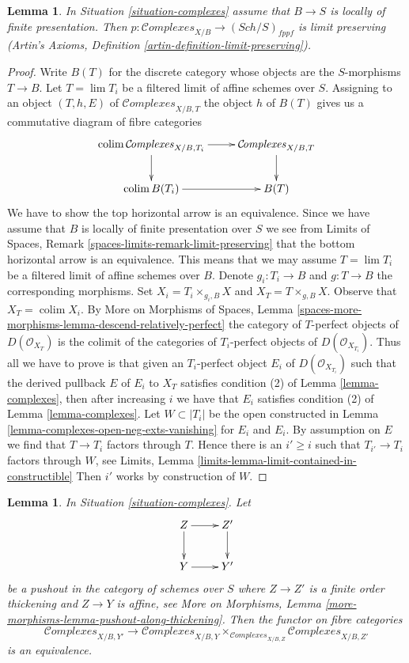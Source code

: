 \documentclass{stacks-project}
\theoremstyle{plain}
\newtheorem{lemma}[subsection]{Lemma}
\theoremstyle{definition}
\theoremstyle{remark}
\numberwithin{equation}{subsection}
\def\lim{\mathop{\mathrm{lim}}\nolimits}
\def\colim{\mathop{\mathrm{colim}}\nolimits}
\def\Sch{\mathit{Sch}}
\def\Complexesstack{\mathcal{C}\!\mathit{omplexes}}
\begin{document}
\begin{lemma}
\label{lemma-complexes-limits}
In Situation \ref{situation-complexes} assume that $B \to S$
is locally of finite presentation. Then
$p : \Complexesstack_{X/B} \to (\Sch/S)_{fppf}$ is limit preserving
(Artin's Axioms, Definition \ref{artin-definition-limit-preserving}).
\end{lemma}

\begin{proof}
Write $B(T)$ for the discrete category whose
objects are the $S$-morphisms $T \to B$. Let $T = \lim T_i$ be a filtered
limit of affine schemes over $S$. Assigning to an object
$(T, h, E)$ of $\Complexesstack_{X/B, T}$ the object $h$
of $B(T)$ gives us a commutative diagram of fibre categories
$$
\xymatrix{
\colim \Complexesstack_{X/B, T_i} \ar[r] \ar[d] &
\Complexesstack_{X/B, T} \ar[d] \\
\colim B(T_i) \ar[r] & B(T)
}
$$
We have to show the top horizontal arrow is an equivalence. Since
we have assume that $B$ is locally of finite presentation over $S$
we see from
Limits of Spaces, Remark \ref{spaces-limits-remark-limit-preserving}
that the bottom horizontal arrow is an equivalence. This means that
we may assume $T = \lim T_i$ be a filtered limit of affine schemes over
$B$. Denote $g_i : T_i \to B$ and $g : T \to B$ the corresponding
morphisms. Set $X_i = T_i \times_{g_i, B} X$ and $X_T = T \times_{g, B} X$.
Observe that $X_T = \colim X_i$.
By More on Morphisms of Spaces, Lemma
\ref{spaces-more-morphisms-lemma-descend-relatively-perfect}
the category of $T$-perfect objects of $D(\mathcal{O}_{X_T})$
is the colimit of the categories of $T_i$-perfect objects
of $D(\mathcal{O}_{X_{T_i}})$.
Thus all we have to prove is that given an $T_i$-perfect object
$E_i$ of $D(\mathcal{O}_{X_{T_i}})$ such that
the derived pullback $E$ of $E_i$ to $X_T$ satisfies
condition (2) of Lemma \ref{lemma-complexes},
then after increasing $i$ we have that
$E_i$ satisfies
condition (2) of Lemma \ref{lemma-complexes}.
Let $W \subset |T_i|$ be the open constructed
in Lemma \ref{lemma-complexes-open-neg-exts-vanishing}
for $E_i$ and $E_i$. By assumption on $E$ we find
that $T \to T_i$ factors through $T$.
Hence there is an $i' \geq i$
such that $T_{i'} \to T_i$ factors through $W$, see
Limits, Lemma \ref{limits-lemma-limit-contained-in-constructible}
Then $i'$ works by construction of $W$.
\end{proof}

\begin{lemma}
\label{lemma-complexes-RS-star}
In Situation \ref{situation-complexes}. Let
$$
\xymatrix{
Z \ar[r] \ar[d] & Z' \ar[d] \\
Y \ar[r] & Y'
}
$$
be a pushout in the category of schemes over $S$ where
$Z \to Z'$ is a finite order thickening and $Z \to Y$ is affine, see
More on Morphisms, Lemma \ref{more-morphisms-lemma-pushout-along-thickening}.
Then the functor on fibre categories
$$
\Complexesstack_{X/B, Y'}
\longrightarrow
\Complexesstack_{X/B, Y}
\times_{\Complexesstack_{X/B, Z}}
\Complexesstack_{X/B, Z'}
$$
is an equivalence.
\end{lemma}
\end{document}
